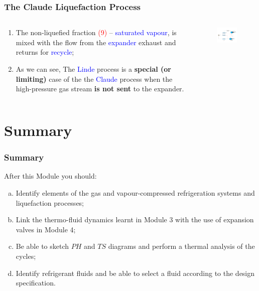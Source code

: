 \documentclass[10pt,compress]{beamer}
\begin{document}
\begin{frame}
 \frametitle{The Claude Liquefaction Process}
  \begin{columns}
   \begin{column}[c]{0.45\linewidth}
  \begin{enumerate}[(1)]
   \item <1-> The non-liquefied fraction \textcolor{red}{(9)} -- \textcolor{blue}{saturated vapour}, is mixed with the flow from the \textcolor{blue}{expander} exhaust and returns for \textcolor{blue}{recycle};
   \item <2-> As we can see, The \textcolor{blue}{Linde} process is a {\bf special (or limiting)} case of the the \textcolor{blue}{Claude} process when the high-pressure gas stream {\bf is not sent} to the expander.
  \end{enumerate}
   \end{column}
   \begin{column}[c]{0.55\linewidth}
    \begin{figure}%
     \begin{center}
      \includegraphics[width=6.5cm,clip]{./Pics/Overview_Refrig40}
     \end{center}
    \end{figure}  
   \end{column}  
  \end{columns}
\end{frame}


\section{Summary}

\begin{frame}
 \frametitle{Summary}
  After this Module you should:
 \begin{enumerate}[(a)]
  \item <1-> Identify elements of the gas and vapour-compressed refrigeration systems and liquefaction processes;
  \item <2-> Link the thermo-fluid dynamics learnt in Module 3 with the use of expansion valves in Module 4;
  \item <3-> Be able to sketch $PH$ and $TS$ diagrams and perform a thermal analysis of the cycles;
  \item <4-> Identify refrigerant fluids and be able to select a fluid according to the design specification.
 \end{enumerate}
\end{frame}
\end{document}
